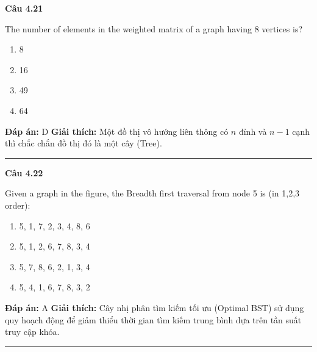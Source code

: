 \documentclass[11pt,a4paper]{article}
\newenvironment{question}[1]{%
  \par\vspace{1em}\noindent\textbf{\large Câu #1}\par\vspace{0.4em}
}{%
  \par\vspace{1em}\hrule\vspace{0.6em}
}
\newenvironment{choices}{%
  \begin{enumerate}[label=\textbf{\Alph*.},leftmargin=2.2em,itemsep=2pt,topsep=3pt]
}{%
  \end{enumerate}
}
\newcommand{\choice}{\item}
\begin{document}
\begin{question}{4.21}
The number of elements in the weighted matrix of a graph having 8 vertices is?
\begin{choices}
\choice 8
\choice 16
\choice 49
\choice 64
\end{choices}
\textbf{Đáp án:} D
\textbf{Giải thích:} Một đồ thị vô hướng liên thông có $n$ đỉnh và $n - 1$ cạnh thì chắc chắn đồ thị đó là một cây (Tree).
\end{question}

\begin{question}{4.22}
Given a graph in the figure, the Breadth first traversal from node 5 is (in 1,2,3 order):
\begin{center}
\end{center}
\begin{choices}
\choice 5, 1, 7, 2, 3, 4, 8, 6
\choice 5, 1, 2, 6, 7, 8, 3, 4
\choice 5, 7, 8, 6, 2, 1, 3, 4
\choice 5, 4, 1, 6, 7, 8, 3, 2
\end{choices}
\textbf{Đáp án:} A
\textbf{Giải thích:} Cây nhị phân tìm kiếm tối ưu (Optimal BST) sử dụng quy hoạch động để giảm thiểu thời gian tìm kiếm trung bình dựa trên tần suất truy cập khóa.
\end{question}
\end{document}
